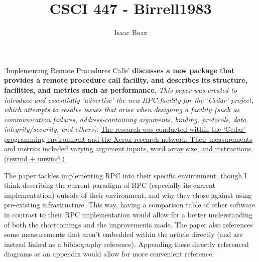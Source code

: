 \documentclass[12pt]{article}
\title{CSCI 447 - Birrell1983}
\author{Isaac Boaz}
\begin{document}
\maketitle
`Implementing Remote Procedures Calls' \textbf{discusses a new package that
    provides a remote procedure call facility, and describes its structure,
    facilities, and metrics such as performance.} \textit{This paper was created
    to introduce and essentially `advertise' the new RPC facility for the
    `Cedar' project, which attempts to resolve issues that arise when designing
    a facility (such as communication failures, address-containing arguments,
    binding, protocols, data integrity/security, and others)}. \ul{The research
    was conducted within the `Cedar' programming environment and the Xerox
    research network. Their measurements and metrics included varying argument
    inputs, word array size, and instructions (rewind + unwind.)}

The paper tackles implementing RPC into their specific environment, though I
think describing the current paradigm of RPC (especially its current
implementation) outside of their environment, and why they chose against using
pre-existing infrastructure.  This way, having a comparison table of other
software in contrast to their RPC implementation would allow for a better
understanding of both the shortcomings and the improvements made. The paper also
references some measurements that aren't embedded within the article directly
(and are instead linked as a bibliography reference). Appending these directly
referenced diagrams as an appendix would allow for more convenient reference.
\end{document}
